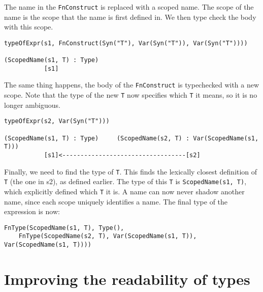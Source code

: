 \noindent
The name in the \verb|FnConstruct| is replaced with a scoped name. The scope of the name is the scope that the name is first defined in. We then type check the body with this scope.

\begin{lstlisting}
typeOfExpr(s1, FnConstruct(Syn("T"), Var(Syn("T")), Var(Syn("T"))))

(ScopedName(s1, T) : Type)
	       [s1]
\end{lstlisting}

\noindent
The same thing happens, the body of the \verb|FnConstruct| is typechecked with a new scope. Note that the type of the new \verb|T| now specifies which \verb|T| it means, so it is no longer ambiguous.

\begin{lstlisting}
typeOfExpr(s2, Var(Syn("T")))

(ScopedName(s1, T) : Type)     (ScopedName(s2, T) : Var(ScopedName(s1, T)))
	       [s1]<----------------------------------[s2]
\end{lstlisting}

Finally, we need to find the type of \verb|T|. This finds the lexically closest definition of \verb|T| (the one in s2), as defined earlier. The type of this \verb|T| is \verb|ScopedName(s1, T)|, which explicitly defined which \verb|T| it is. A name can now never shadow another name, since each scope uniquely identifies a name. The final type of the expression is now:

\begin{lstlisting}
FnType(ScopedName(s1, T), Type(),
	FnType(ScopedName(s2, T), Var(ScopedName(s1, T)), Var(ScopedName(s1, T))))
\end{lstlisting}

\section{Improving the readability of types}



